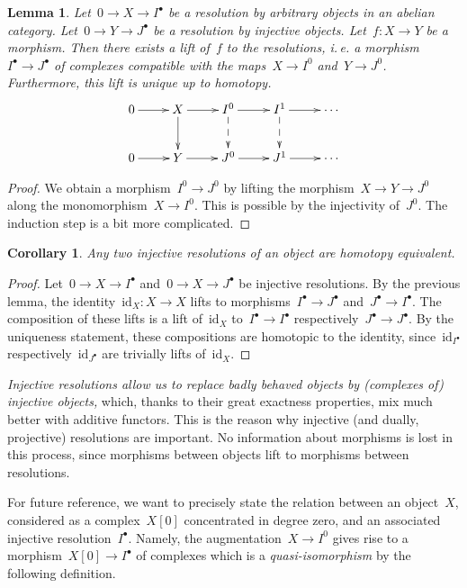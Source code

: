 \documentclass{amsart}
\makeatletter
\theoremstyle{definition}
\theoremstyle{plain}
\newtheorem{cor}[defn]{Corollary}
\newtheorem{lemma}[defn]{Lemma}
\theoremstyle{remark}
\newcommand{\id}{\mathrm{id}}
\newcommand{\?}{\,{:}\,}
\renewcommand{\_}{\mathpunct{.}\,}
\newcommand{\ie}{i.\,e.\@\xspace}
\makeatother
\begin{document}
\begin{lemma}\label{lemma:inj-funct}Let~$0 \to X \to I^\bullet$ be a resolution
by arbitrary objects in an abelian category. Let~$0 \to Y \to J^\bullet$ be a
resolution by injective objects. Let~$f : X \to Y$ be a morphism. Then there
exists a lift of~$f$ to the resolutions, \ie a morphism~$I^\bullet \to
J^\bullet$ of complexes compatible with the maps~$X \to I^0$ and~$Y \to J^0$.
Furthermore, this lift is unique up to homotopy.
\[ \xymatrix{
  0 \ar[r] & X \ar[r]\ar[d] & I^0 \ar[r]\ar@{-->}[d] & I^1 \ar[r]\ar@{-->}[d] & \cdots \\
  0 \ar[r] & Y \ar[r] & J^0 \ar[r] & J^1 \ar[r] & \cdots
} \]
\end{lemma}
\begin{proof}We obtain a morphism~$I^0 \to J^0$ by lifting the morphism~$X \to
Y \to J^0$ along the monomorphism~$X \to I^0$. This is possible by the
injectivity of~$J^0$. The induction step is a bit more complicated.
\end{proof}

\begin{cor}\label{cor:inj-he}Any two injective resolutions of an object are
homotopy equivalent.\end{cor}
\begin{proof}Let~$0 \to X \to I^\bullet$ and~$0 \to X \to J^\bullet$ be
injective resolutions. By the previous lemma, the identity~$\id_X : X \to X$ lifts to
morphisms~$I^\bullet \to J^\bullet$ and~$J^\bullet \to I^\bullet$. The
composition of these lifts is a lift of~$\id_X$ to~$I^\bullet \to I^\bullet$
respectively~$J^\bullet \to J^\bullet$. By the uniqueness statement, these
compositions are homotopic to the identity, since~$\id_{I^\bullet}$
respectively~$\id_{J^\bullet}$ are trivially lifts of~$\id_X$.\end{proof}

\emph{Injective resolutions allow us to replace badly behaved
objects by (complexes of) injective objects,} which, thanks to their great
exactness properties, mix much better with additive functors. This is the
reason why injective (and dually, projective) resolutions are important. No
information about morphisms is lost in this process, since morphisms between
objects lift to morphisms between resolutions.

For future reference, we want to precisely state the relation between an
object~$X$, considered as a complex~$X[0]$ concentrated in degree zero, and
an associated injective resolution~$I^\bullet$. Namely, the augmentation~$X \to
I^0$ gives rise to a morphism~$X[0] \to I^\bullet$ of complexes which is
a \emph{quasi-isomorphism} by the following definition.
\end{document}
